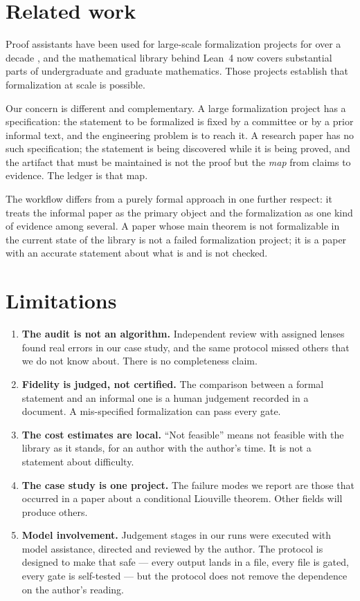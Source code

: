 \documentclass[11pt]{article}
\newcommand{\Lean}{Lean}
\begin{document}
\section{Related work}

Proof assistants have been used for large-scale formalization projects for
over a decade \cite{Hales,OddOrder}, and the mathematical library
\cite{mathlib} behind \Lean~4 \cite{Lean4} now covers substantial parts of
undergraduate and graduate mathematics. Those projects establish that
formalization at scale is possible.

Our concern is different and complementary. A large formalization project has
a specification: the statement to be formalized is fixed by a committee or by a
prior informal text, and the engineering problem is to reach it. A research
paper has no such specification; the statement is being discovered while it is
being proved, and the artifact that must be maintained is not the proof but the
\emph{map} from claims to evidence. The ledger is that map.

The workflow differs from a purely formal approach in one further respect: it
treats the informal paper as the primary object and the formalization as one
kind of evidence among several. A paper whose main theorem is not formalizable
in the current state of the library is not a failed formalization project; it
is a paper with an accurate statement about what is and is not checked.

\section{Limitations}

\begin{enumerate}
\item \textbf{The audit is not an algorithm.} Independent review with assigned
  lenses found real errors in our case study, and the same protocol missed
  others that we do not know about. There is no completeness claim.
\item \textbf{Fidelity is judged, not certified.} The comparison between a
  formal statement and an informal one is a human judgement recorded in a
  document. A mis-specified formalization can pass every gate.
\item \textbf{The cost estimates are local.} ``Not feasible'' means not
  feasible with the library as it stands, for an author with the author's time.
  It is not a statement about difficulty.
\item \textbf{The case study is one project.} The failure modes we report are
  those that occurred in a paper about a conditional Liouville theorem. Other
  fields will produce others.
\item \textbf{Model involvement.} Judgement stages in our runs were executed
  with model assistance, directed and reviewed by the author. The protocol is
  designed to make that safe --- every output lands in a file, every file is
  gated, every gate is self-tested --- but the protocol does not remove the
  dependence on the author's reading.
\end{enumerate}
\end{document}
